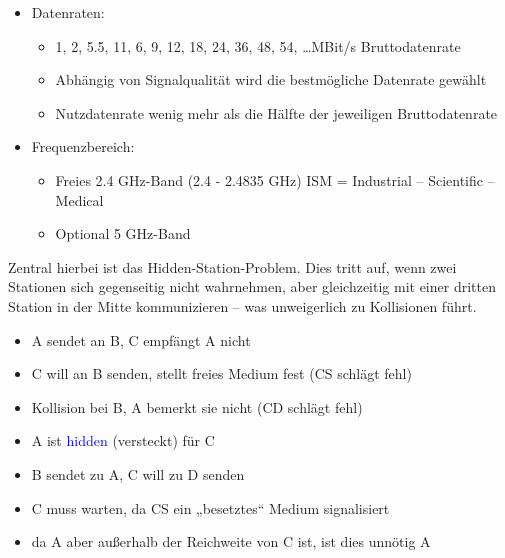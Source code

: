 \begin{itemize}
    \item Datenraten:
    \begin{itemize}
        \item 1, 2, 5.5, 11, 6, 9, 12, 18, 24, 36, 48, 54, \ldots MBit/s Bruttodatenrate
        \item Abhängig von Signalqualität wird die bestmögliche Datenrate gewählt
        \item Nutzdatenrate wenig mehr als die Hälfte der jeweiligen Bruttodatenrate
    \end{itemize}
    \item Frequenzbereich:
    \begin{itemize}
        \item Freies 2.4 GHz-Band (2.4 - 2.4835 GHz) ISM = Industrial – Scientific – Medical
        \item Optional 5 GHz-Band
    \end{itemize}
\end{itemize}

Zentral hierbei ist das Hidden-Station-Problem.
Dies tritt auf, wenn zwei Stationen sich gegenseitig nicht wahrnehmen, aber gleichzeitig mit einer dritten Station in der Mitte kommunizieren – was unweigerlich zu Kollisionen führt.

\begin{itemize}
    \item A sendet an B, C empfängt A nicht
    \item C will an B senden, stellt freies Medium fest (CS schlägt fehl)
    \item Kollision bei B, A bemerkt sie nicht (CD schlägt fehl)
    \item A ist \textcolor{blue}{hidden} (versteckt) für C
\end{itemize}

\begin{itemize}
    \item B sendet zu A, C will zu D senden
    \item C muss warten, da CS ein „besetztes“ Medium signalisiert
    \item da A aber außerhalb der Reichweite von C ist, ist dies unnötig A
\end{itemize}

